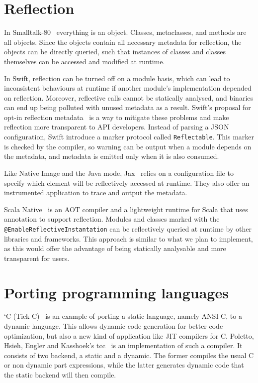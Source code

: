 \section{Reflection}
In Smalltalk-80~\cite{goldberg_smalltalk-80_1983} everything is an object. Classes, metaclasses, and methods are all objects. Since the objects contain all necessary metadata for reflection, the objects can be directly queried, such that instances of classes and classes themselves can be accessed and modified at runtime. 

In Swift, reflection can be turned off on a module basis, which can lead to inconsistent behaviours at runtime if another module's implementation depended on reflection. Moreover, reflective calls cannot be statically analysed, and binaries can end up being polluted with unused metadata as a result. Swift's proposal for opt-in reflection metadata~\cite{noauthor_pitch_2022} is a way to mitigate these problems and make reflection more transparent to API developers.
Instead of parsing a JSON configuration, Swift introduce a marker protocol called \verb|Reflectable|. This marker is checked by the compiler, so warning can be output when a module depends on the metadata, and metadata is emitted only when it is also consumed.

Like Native Image and the Java mode, Jax~\cite{tip_practical_1999} relies on a configuration file to specify which element will be reflectively accessed at runtime. They also offer an instrumented application to trace and output the metadata.

Scala Native~\cite{noauthor_scala_nodate} is an AOT compiler and a lightweight runtime for Scala that uses annotation to support reflection. Modules and classes marked with the \verb|@EnableReflectiveInstantation| can be reflectively queried at runtime by other libraries and frameworks.
This approach is similar to what we plan to implement, as this would offer the advantage of being statically analysable and more transparent for users.

\section{Porting programming languages}
`C (Tick C)~\cite{engler_c_1996} is an example of porting a static language, namely ANSI C, to a dynamic language. This allows dynamic code generation for better code optimization, but also a new kind of application like JIT compilers for C. Poletto, Hsieh, Engler and Kasshoek's tcc~\cite{poletto_c_1999} is an implementation of such a compiler. It consists of two backend, a static and a dynamic.
The former compiles the usual C or non dynamic part expressions, while the latter generates dynamic code that the static backend will then compile.

